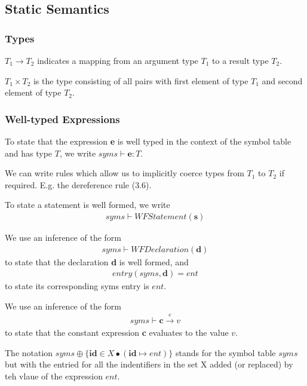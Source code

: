 \subsection{Static Semantics}

\subsubsection{Types}
$T_1 \rightarrow T_2$ indicates a mapping from an argument type $T_1$ to a result type $T_2$.

$T_1 \times T_2$ is the type consisting of all pairs with first element of type $T_1$ and 
second element of type $T_2$.

\subsubsection{Well-typed Expressions}
To state that the expression \textbf{e} is well typed in the context of the symbol table and has 
type $T$, we write $syms \vdash \textbf{e} : T$.

We can write rules which allow us to implicitly coerce types from $T_1$ to $T_2$ if required. 
E.g. the dereference rule (3.6).

To state a statement is well formed, we write
\begin{gather*}
    syms \vdash WFStatement(\textbf{s})
\end{gather*}

We use an inference of the form
\begin{gather*}
    syms \vdash WFDeclaration(\textbf{d})
\end{gather*}
to state that the declaration \textbf{d} is well
formed, and
\begin{gather*}
    entry(syms,\textbf{d}) = ent
\end{gather*}
to state its corresponding syms entry is $ent$.

We use an inference of the form
\begin{gather*}
    syms \vdash \textbf{c} \xrightarrow{e} v
\end{gather*}
to state that the constant expression \textbf{c} evaluates to the value $v$.

The notation $syms \oplus \{ \textbf{id} \in X \bullet (\textbf{id} \mapsto ent)\}$ 
stands for the symbol table $syms$ but with the entried for all the indentifiers in the set 
X added (or replaced) by teh vlaue of the expression $ent$.

